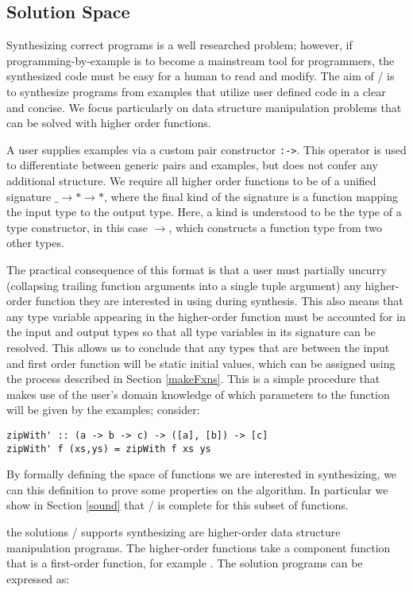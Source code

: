 \subsection{Solution Space}\label{solnSpace}
Synthesizing correct programs is a well researched problem; however, if programming-by-example is to become a mainstream tool for programmers, the synthesized code must be easy for a human to read and modify.
The aim of \ourTool/ is to synthesize programs from examples that utilize user defined code in a clear and concise.
We focus particularly on data structure manipulation problems that can be solved with higher order functions.


A user supplies examples via a custom pair constructor \texttt{:->}. This operator is used to differentiate between generic pairs and examples, but does not confer any additional structure. We require all higher order functions to be of a unified signature \texttt{$\_ \to * \to *$}, where the final kind of the signature is a function mapping the input type to the output type. Here, a kind is understood to be the type of a type constructor, in this case \texttt{$\to$}, which constructs a function type from two other types.

The practical consequence of this format is that a user must partially uncurry (collapsing trailing function arguments into a single tuple argument) any higher-order function they are interested in using during synthesis.
This also means that any type variable appearing in the higher-order function must be accounted for in the input and output types so that all type variables in its signature can be resolved.
This allows us to conclude that any types that are between the input and first order function will be static initial values, which can be assigned using the process described in Section \ref{makeFxns}.
This is a simple procedure that makes use of the user's domain knowledge of which parameters to the function will be given by the examples; consider:

\begin{lstlisting}
zipWith' :: (a -> b -> c) -> ([a], [b]) -> [c]
zipWith' f (xs,ys) = zipWith f xs ys
\end{lstlisting}

By formally defining the space of functions we are interested in synthesizing, we can this definition to prove some properties on the algorithm.
In particular we show in Section \ref{sound} that \ourTool/ is complete for this subset of functions.

the solutions \ourTool/ supports synthesizing are higher-order data structure manipulation programs.
The higher-order functions take a component function that is a first-order function, for example \codeinline{(+)}.
The solution programs can be expressed as:

